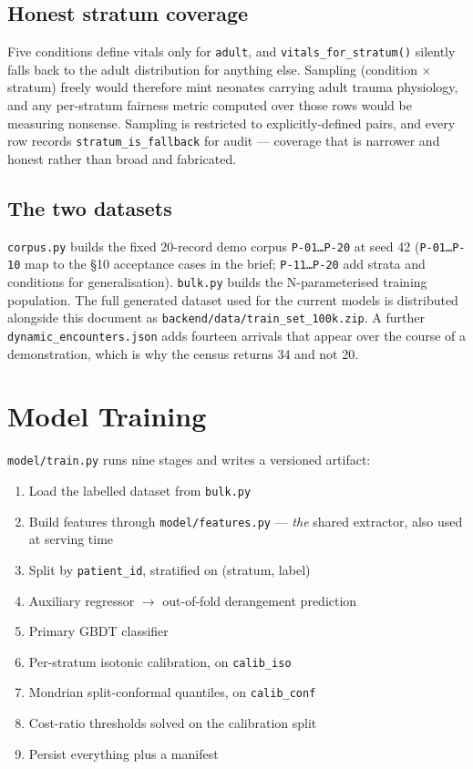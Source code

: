 \documentclass[10pt,a4paper,twocolumn]{article}
\newcommand{\pth}[1]{\textcolor{SecPurple}{\texttt{#1}}}
\newcommand{\cm}[1]{\texttt{#1}}
\begin{document}
\subsection{Honest stratum coverage}
Five conditions define vitals only for \cm{adult}, and \cm{vitals\_for\_stratum()} silently falls
back to the adult distribution for anything else. Sampling (condition $\times$ stratum) freely
would therefore mint neonates carrying adult trauma physiology, and any per-stratum fairness metric
computed over those rows would be measuring nonsense. Sampling is restricted to explicitly-defined
pairs, and every row records \cm{stratum\_is\_fallback} for audit --- coverage that is narrower and
honest rather than broad and fabricated.

\subsection{The two datasets}
\pth{corpus.py} builds the fixed 20-record demo corpus \cm{P-01…P-20} at seed 42 (\cm{P-01…P-10}
map to the §10 acceptance cases in the brief; \cm{P-11…P-20} add strata and conditions for
generalisation). \pth{bulk.py} builds the N-parameterised training population. The full
generated dataset used for the current models is distributed alongside this document as
\pth{backend/data/train\_set\_100k.zip}. A further \pth{dynamic\_encounters.json} adds fourteen
arrivals that appear over the course of a demonstration, which is why the census returns 34 and
not 20.

\section{Model Training}
\label{sec:train}

\pth{model/train.py} runs nine stages and writes a versioned artifact:

\begin{enumerate}
  \item Load the labelled dataset from \pth{bulk.py}
  \item Build features through \pth{model/features.py} --- \emph{the} shared extractor, also used
        at serving time
  \item Split by \cm{patient\_id}, stratified on (stratum, label)
  \item Auxiliary regressor $\rightarrow$ out-of-fold derangement prediction
  \item Primary GBDT classifier
  \item Per-stratum isotonic calibration, on \cm{calib\_iso}
  \item Mondrian split-conformal quantiles, on \cm{calib\_conf}
  \item Cost-ratio thresholds solved on the calibration split
  \item Persist everything plus a manifest
\end{enumerate}
\end{document}
